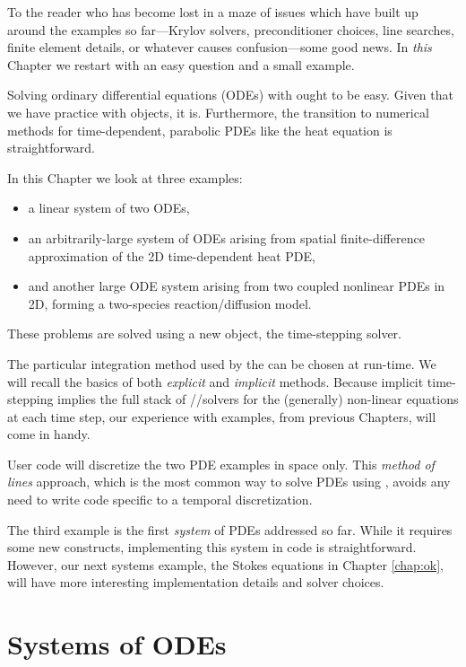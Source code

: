 
To the reader who has become lost in a maze of issues which have built up around the examples so far---Krylov solvers, preconditioner choices, line searches, finite element details, or whatever causes confusion---some good news.  In \emph{this} Chapter we restart with an easy question and a small example.

Solving ordinary differential equations (ODEs) with \PETSc ought to be easy.  Given that we have practice with \PETSc objects, it is.  Furthermore, the transition to numerical methods for time-dependent, parabolic PDEs like the heat equation is straightforward.

In this Chapter we look at three examples:
\begin{itemize}
\item a linear system of two ODEs,
\item an arbitrarily-large system of ODEs arising from spatial finite-difference approximation of the 2D time-dependent heat PDE,
\item and another large ODE system arising from two coupled nonlinear PDEs in 2D, forming a two-species reaction/diffusion model.
\end{itemize}
These problems are solved using a new \PETSc object, the \pTS time-stepping solver.

The particular integration method used by the \pTS can be chosen at run-time.  We will recall the basics of both \emph{explicit} and \emph{implicit} methods.  Because implicit time-stepping implies the full stack of \pSNES/\pKSP/\pPC solvers for the (generally) non-linear equations at each time step, our experience with \pSNES examples, from previous Chapters, will come in handy.

User code will discretize the two PDE examples in space only.  This \emph{method of lines} approach, which is the most common way to solve PDEs using \PETSc \pTS, avoids any need to write code specific to a temporal discretization.

The third example is the first \emph{system} of PDEs addressed so far.  While it requires some new constructs, implementing this system in \PETSc code is straightforward.  However, our next systems example, the Stokes equations in Chapter \ref{chap:ok}, will have more interesting implementation details and solver choices.


\section{Systems of ODEs}

